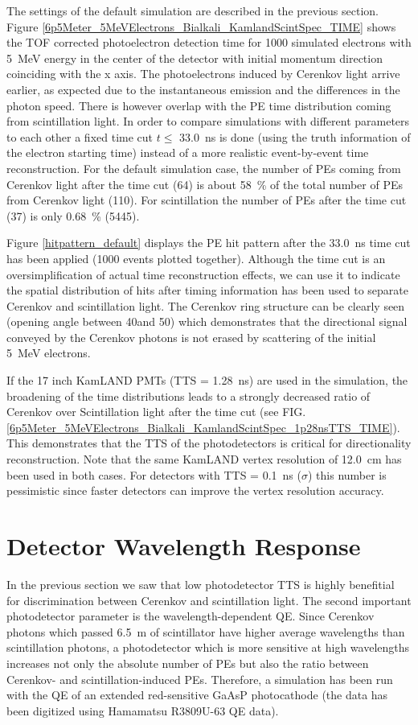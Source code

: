 \documentclass[aps,prc,twocolumn,groupedaddress,showpacs,amsmath,amssymb,floatfix,superscriptaddress]{revtex4}
\begin{document}
The settings of the default simulation are described in the previous section. Figure \ref{6p5Meter_5MeVElectrons_Bialkali_KamlandScintSpec_TIME} shows the TOF corrected photoelectron detection time for 1000 simulated electrons with 5~MeV energy in the center of the detector with initial momentum direction coinciding with the x axis. The photoelectrons induced by Cerenkov light arrive earlier, as expected due to the instantaneous emission and the differences in the photon speed. There is however overlap with the PE time distribution coming from scintillation light. In order to compare simulations with different parameters to each other a fixed time cut $t \leq$ 33.0~ns is done (using the truth information of the electron starting time) instead of a more realistic event-by-event time reconstruction. For the default simulation case, the number of PEs coming from Cerenkov light after the time cut (64) is about 58~\% of the total number of PEs from Cerenkov light (110). For scintillation the number of PEs after the time cut (37) is only 0.68~\% (5445).  

Figure \ref{hitpattern_default} displays the PE hit pattern after the 33.0~ns time cut has been applied (1000 events plotted together). Although the time cut is an oversimplification of actual time reconstruction effects, we can use it to indicate the spatial distribution of hits after timing information has been used to separate Cerenkov and scintillation light. The Cerenkov ring structure can be clearly seen (opening angle between 40\textdegree and 50\textdegree) which demonstrates that the directional signal conveyed by the Cerenkov photons is not erased by scattering of the initial 5~MeV electrons.  

If the 17 inch KamLAND PMTs \cite{tbd} (TTS = 1.28~ns) are used in the simulation, the broadening of the time distributions leads to a strongly decreased ratio of Cerenkov over Scintillation light after the time cut (see FIG. \ref{6p5Meter_5MeVElectrons_Bialkali_KamlandScintSpec_1p28nsTTS_TIME}). This demonstrates that the TTS of the photodetectors is critical for directionality reconstruction. Note that the same KamLAND vertex resolution of 12.0~cm has been used in both cases. For detectors with TTS = 0.1~ns ($\sigma$) this number is pessimistic since faster detectors can improve the vertex resolution accuracy. 

\section{Detector Wavelength Response}
\label{detector_wavelength_response_sec} 
In the previous section we saw that low photodetector TTS is highly benefitial for discrimination between Cerenkov and scintillation light. The second important photodetector parameter is the wavelength-dependent QE. Since Cerenkov photons which passed 6.5~m of scintillator have higher average wavelengths than scintillation photons, a photodetector which is more sensitive at high wavelengths increases not only the absolute number of PEs but also the ratio between Cerenkov- and scintillation-induced PEs. Therefore, a simulation has been run with the QE of an extended red-sensitive GaAsP photocathode (the data has been digitized using Hamamatsu R3809U-63 QE data).
\end{document}
